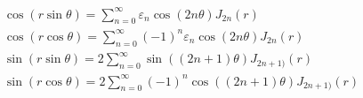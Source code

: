 \documentclass[leqno]{ltjsarticle}%
\begin{document}
\begin{gather*}
	\cos(r\sin\theta) = \sum_{n=0}^\infty \varepsilon_n\cos(2n\theta)J_{2n}(r)\\ 
	\cos(r\cos\theta) = \sum_{n=0}^\infty (-1)^n\varepsilon_n\cos(2n\theta)J_{2n}(r)\\ 
	\sin(r\sin\theta) = 2\sum_{n=0}^\infty \sin((2n+1)\theta)J_{2n+1)}(r) \\
	\sin(r\cos\theta) = 2\sum_{n=0}^\infty (-1)^n\cos((2n+1)\theta)J_{2n+1)}(r) 
\end{gather*}
\end{document}

